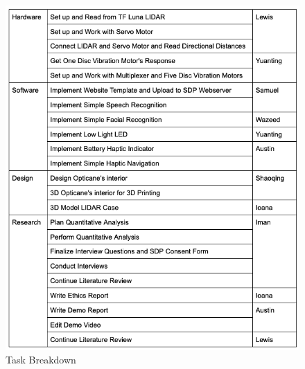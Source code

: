 \documentclass{article}
\begin{document}
\begin{figure}[tb]
\vskip 5mm
\begin{center}
\centerline{\includegraphics[width=\columnwidth]{figs/task-breakdown}}
\caption{Task Breakdown}
\label{fig:tickets}
\end{center}
\vskip -5mm
\end{figure} 


\end{document}
